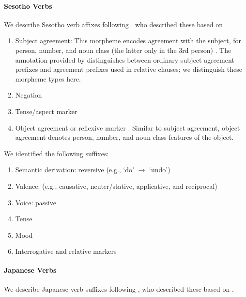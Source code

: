 \documentclass[11pt,letterpaper]{article}
\begin{document}
\paragraph{Sesotho Verbs}
We describe Sesotho verb affixes following \cite{Hahn2020modeling}.
who described these based on \citep{doke1967textbook, guma1971outline, demuth1992acquisition}

\begin{enumerate}
    \item Subject agreement: This morpheme encodes agreement with the subject, for person, number, and noun class (the latter only in the 3rd person) \cite[]{doke1967textbook}.
            The annotation provided by \cite{demuth1992acquisition} distinguishes between ordinary subject agreement prefixes and agreement prefixes used in relative clauses; we distinguish these morpheme types here.

    \item Negation \citep[]{doke1967textbook}

    \item Tense/aspect marker   \citep[--424]{doke1967textbook}

    \item Object agreement or reflexive marker \citep[]{doke1967textbook}.
    Similar to subject agreement, object agreement denotes person, number, and noun class features of the object.
\end{enumerate}
We identified the following suffixes:

\begin{enumerate}
\item Semantic derivation: reversive (e.g., `do' $\rightarrow$ `undo')
\item Valence: (e.g., causative, neuter/stative, applicative, and reciprocal)
    \item Voice: passive
    \item Tense
    \item Mood
    \item Interrogative and relative markers
\end{enumerate}



\paragraph{Japanese Verbs}
We describe Japanese verb suffixes following \citep{Hahn2020modeling}, who described these based on \citep{kaiser2013japanese,hasegawa2014japanese}.
\end{document}
